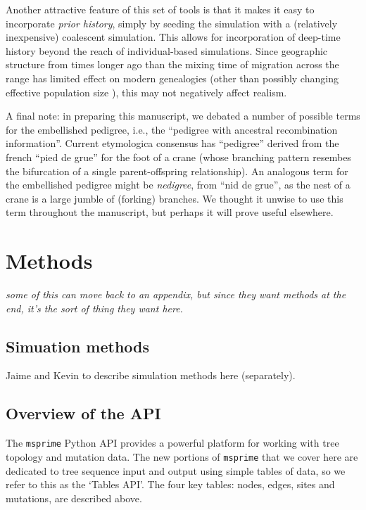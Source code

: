 \documentclass{article}
\newcommand{\msprime}{\texttt{msprime}}
\newcommand{\plr}[1]{{\em \color{blue} #1}}
\begin{document}
Another attractive feature of this set of tools
is that it makes it easy to incorporate \emph{prior history},
simply by seeding the simulation with a (relatively inexpensive) coalescent simulation.
This allows for incorporation of deep-time history beyond the reach of individual-based simulations.
Since geographic structure from times longer ago than the mixing
time of migration across the range has limited effect on modern genealogies
\citep{wilkins2004separation} (other than possibly changing effective population
size \citet{barton2002neutral,cox2002stepping}), this may not negatively affect realism.


A final note:
in preparing this manuscript,
we debated a number of possible terms for the embellished pedigree,
i.e., the ``pedigree with ancestral recombination information''.
Current etymologica consensus \citep{liberman2014little} has
``pedigree'' derived from the french ``pied de grue'' for the foot of a crane
(whose branching pattern resembes the bifurcation of a single parent-offspring relationship).
An analogous term for the embellished pedigree might be \emph{nedigree},
from ``nid de grue'',
as the nest of a crane is a large jumble of (forking) branches.
We thought it unwise to use this term throughout the manuscript,
but perhaps it will prove useful elsewhere.


\section*{Methods}

\plr{some of this can move back to an appendix, but since they want methods at the end,
it's the sort of thing they want here.}

\subsection*{Simuation methods}

Jaime and Kevin to describe simulation methods here (separately).

\subsection*{Overview of the API}

The \msprime{} Python API provides a powerful platform for working with tree topology and mutation data.
The new portions of \msprime{} that we cover here
are dedicated to tree sequence input and output using simple tables of data,
so we refer to this as the `Tables API'.
The four key tables: nodes, edges, sites and mutations, are described above.
\end{document}

